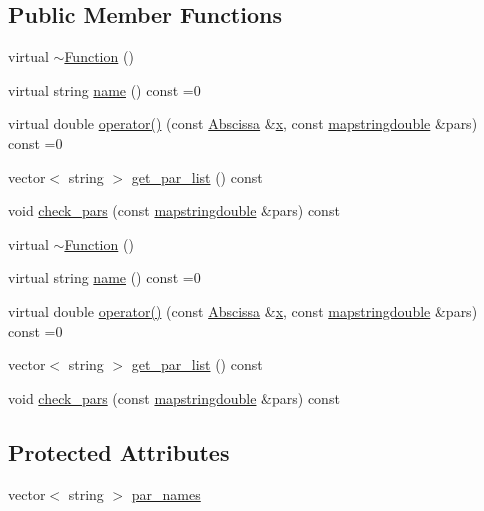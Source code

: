 \subsection*{Public Member Functions}
\begin{DoxyCompactItemize}
\item 
virtual \mbox{\hyperlink{classFunction_a8697b2e490a4314a7ccbb17aea8ce537}{$\sim$\+Function}} ()
\item 
virtual string \mbox{\hyperlink{classFunction_ac6dc83996d6f002141a0a0f66f2c6496}{name}} () const =0
\item 
virtual double \mbox{\hyperlink{classFunction_a8cd7f815d5f883cc523341c53ba811d0}{operator()}} (const \mbox{\hyperlink{classAbscissa}{Abscissa}} \&\mbox{\hyperlink{old__edb_8cc_a63584b830e7aaacb521b11b72291a4bc}{x}}, const \mbox{\hyperlink{lib_2fitting__lib_2includes_8h_a647b481c557c7966517f753340a81d13}{mapstringdouble}} \&pars) const =0
\item 
vector$<$ string $>$ \mbox{\hyperlink{classFunction_a77c4395678c3ad7435ef23a661e3ff6d}{get\+\_\+par\+\_\+list}} () const
\item 
void \mbox{\hyperlink{classFunction_a6f2286114002e574154727a813957175}{check\+\_\+pars}} (const \mbox{\hyperlink{lib_2fitting__lib_2includes_8h_a647b481c557c7966517f753340a81d13}{mapstringdouble}} \&pars) const
\item 
virtual \mbox{\hyperlink{classFunction_a8697b2e490a4314a7ccbb17aea8ce537}{$\sim$\+Function}} ()
\item 
virtual string \mbox{\hyperlink{classFunction_ac6dc83996d6f002141a0a0f66f2c6496}{name}} () const =0
\item 
virtual double \mbox{\hyperlink{classFunction_a8cd7f815d5f883cc523341c53ba811d0}{operator()}} (const \mbox{\hyperlink{classAbscissa}{Abscissa}} \&\mbox{\hyperlink{old__edb_8cc_a63584b830e7aaacb521b11b72291a4bc}{x}}, const \mbox{\hyperlink{lib_2fitting__lib_2includes_8h_a647b481c557c7966517f753340a81d13}{mapstringdouble}} \&pars) const =0
\item 
vector$<$ string $>$ \mbox{\hyperlink{classFunction_a77c4395678c3ad7435ef23a661e3ff6d}{get\+\_\+par\+\_\+list}} () const
\item 
void \mbox{\hyperlink{classFunction_a6f2286114002e574154727a813957175}{check\+\_\+pars}} (const \mbox{\hyperlink{lib_2fitting__lib_2includes_8h_a647b481c557c7966517f753340a81d13}{mapstringdouble}} \&pars) const
\end{DoxyCompactItemize}
\subsection*{Protected Attributes}
\begin{DoxyCompactItemize}
\item 
vector$<$ string $>$ \mbox{\hyperlink{classFunction_abe956c2e0616da26f188cccfd1df1203}{par\+\_\+names}}
\end{DoxyCompactItemize}


